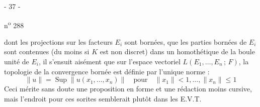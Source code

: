 \begin{center}- 37 -\end{center}
\hfill n\textsuperscript{o} 288

dont les projections sur les facteurs $E_i$ sont bornées, que les parties bornées de $E_i$ sont contenues (du moins si $K$ est non discret) dans un homothétique de la boule unité de $E_i$, il s'ensuit aisément que sur l'espace vectoriel $L(E_1,\ldots,E_n\,;\,F)$, la topologie de la convergence bornée est définie par l'unique norme :
\[
\|u\|=\operatorname{Sup}\|u(x_1,\ldots,x_n)\|\quad\text{pour}\quad\|x_1\|<1,\ldots,\|x_n\|\leq1
\]
Ceci mérite sans doute une proposition en forme et une rédaction moins cursive, mais l'endroit pour ces sorites semblerait plutôt dans les E.V.T.
